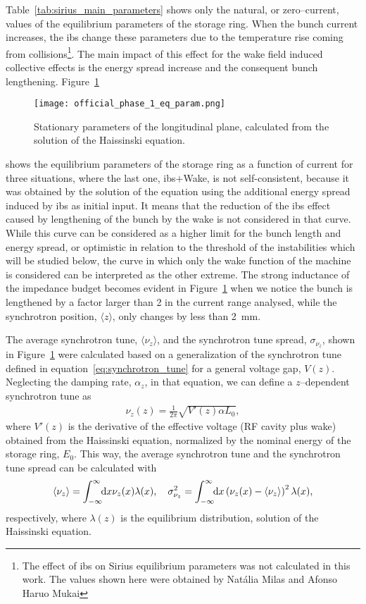     Table~\ref{tab:sirius_main_parameters} shows only the natural, or zero--current, values of the equilibrium parameters of the storage ring. When the bunch current increases, the \gls{ibs} change these parameters due to the temperature rise coming from collisions\footnote{The effect of \gls{ibs} on Sirius equilibrium parameters was not  calculated in this work. The values shown here were obtained by Natália Milas and Afonso Haruo Mukai}. The main impact of this effect for the wake field induced collective effects is the energy spread increase and the consequent bunch lengthening.  Figure~\ref{fig:ph1_eq_param}
    \begin{figure}
        \centering
        \texttt{[image: official\_phase\_1\_eq\_param.png]}
        \caption{Stationary parameters of the longitudinal plane, calculated from the solution of the Haissinski equation.}
        \label{fig:ph1_eq_param}
    \end{figure}
    shows the equilibrium parameters of the storage ring as a function of current for three situations, where the last one, \gls{ibs}$+$Wake, is not self-consistent, because it was obtained by the solution of the  equation using the additional energy spread induced by \gls{ibs} as initial input. It means that the reduction of the \gls{ibs} effect caused by lengthening of the bunch by the wake is not considered in that curve. While this curve can be considered as a higher limit for the bunch length and energy spread, or optimistic in relation to the threshold of the instabilities which will be studied below, the curve in which only the wake function of the machine is considered can be interpreted as the other extreme. The strong inductance of the impedance budget becomes evident in Figure~\ref{fig:ph1_eq_param} when we notice the bunch is lengthened by a factor larger than \num{2} in the current range analysed, while the synchrotron position, $\langle z \rangle$, only changes by less than \SI{2}{\milli\meter}.

    The average synchrotron tune, $\langle \nu_z \rangle$, and the synchrotron tune spread, $\sigma_{\nu_z}$, shown in Figure~\ref{fig:ph1_eq_param} were calculated based on a generalization of the synchrotron tune defined in equation~\ref{eq:synchrotron_tune} for a general voltage gap, $V(z)$. Neglecting the damping rate, $\alpha_z$, in that equation, we can define a $z$--dependent synchrotron tune as
    \begin{align}
        \nu_z(z) = \frac{1}{2\pi}\sqrt{V'(z)\alpha L_0},
    \end{align}
    where $V'(z)$ is the derivative of the effective voltage (RF cavity plus wake) obtained from the Haissinski equation, normalized by the nominal energy of the storage ring, $E_0$. This way, the average synchrotron tune and the synchrotron tune spread can be calculated with
    \begin{align}
        \langle \nu_z \rangle = \int_{-\infty}^{\infty}\!\!\text{d}x \nu_z(x)\lambda(x),\quad
        \sigma_{\nu_z}^2 = \int_{-\infty}^{\infty}\!\!\text{d}x \left(\nu_z(x)-\langle \nu_z \rangle\right)^2\lambda(x),
    \end{align}
    respectively, where $\lambda(z)$ is the equilibrium distribution, solution of the Haissinski equation.


